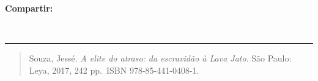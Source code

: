 \begin{textblock*}{68mm}
{\begin{minipage}[t]{68mm}
{\bfseries\color{azulrevista!70}Compartir:}\par\vspace{3pt}
{\large
\href{https://bsky.app/intent/compose?text=https%3A%2F%2Fpt.wikipedia.org%2Fwiki%2FA_Elite_do_Atraso}{}~
\href{mailto:?subject=Rese%C3%B1a%20del%20libro%20A%20elite%20do%20atraso%3A%20da%20escravid%C3%A3o%20%C3%A0%20Lava%20Jato&body=https%3A%2F%2Fpt.wikipedia.org%2Fwiki%2FA_Elite_do_Atraso}{}~
\href{https://www.facebook.com/sharer/sharer.php?u=https%3A%2F%2Fpt.wikipedia.org%2Fwiki%2FA_Elite_do_Atraso}{}~
\href{https://www.linkedin.com/sharing/share-offsite/?url=https%3A%2F%2Fpt.wikipedia.org%2Fwiki%2FA_Elite_do_Atraso}{}~
\href{https://www.reddit.com/submit?url=https%3A%2F%2Fpt.wikipedia.org%2Fwiki%2FA_Elite_do_Atraso&title=Rese%C3%B1a%20del%20libro%20A%20elite%20do%20atraso%3A%20da%20escravid%C3%A3o%20%C3%A0%20Lava%20Jato}{}~
\href{https://www.researchgate.net/search?q=Rese%C3%B1a%20del%20libro%20A%20elite%20do%20atraso%3A%20da%20escravid%C3%A3o%20%C3%A0%20Lava%20Jato}{}~
\href{https://t.me/share/url?url=https%3A%2F%2Fpt.wikipedia.org%2Fwiki%2FA_Elite_do_Atraso&text=Rese%C3%B1a%20del%20libro%20A%20elite%20do%20atraso%3A%20da%20escravid%C3%A3o%20%C3%A0%20Lava%20Jato}{}~
\href{https://wa.me/?text=https%3A%2F%2Fpt.wikipedia.org%2Fwiki%2FA_Elite_do_Atraso}{}~
\href{https://twitter.com/intent/tweet?url=https%3A%2F%2Fpt.wikipedia.org%2Fwiki%2FA_Elite_do_Atraso&text=Rese%C3%B1a%20del%20libro%20A%20elite%20do%20atraso%3A%20da%20escravid%C3%A3o%20%C3%A0%20Lava%20Jato}{}
}\par
\end{minipage}%
}%
\end{textblock*}


\bigskip
\noindent\rule{\linewidth}{0.4pt}
\bigskip


\begin{quote}
Souza, Jessé. \textit{A elite do atraso: da escravidão à Lava Jato}. São Paulo: Leya, 2017, 242 pp. ISBN 978-85-441-0408-1.

\end{quote}

